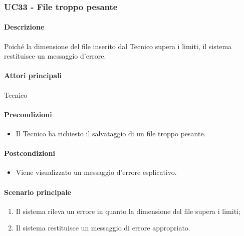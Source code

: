 \subsubsection{UC33 - File troppo pesante}\label{UC33}
\paragraph*{Descrizione}
Poiché la dimensione del file inserito dal Tecnico supera i limiti, il sistema restituisce un messaggio d'errore.

\paragraph*{Attori principali}
Tecnico

\paragraph*{Precondizioni}
\begin{itemize}
  \item Il Tecnico ha richiesto il salvataggio di un file troppo pesante.
\end{itemize}

\paragraph*{Postcondizioni}
\begin{itemize}
  \item Viene visualizzato un messaggio d'errore esplicativo.
\end{itemize}

\paragraph*{Scenario principale}
\begin{enumerate}
  \item Il sistema rileva un errore in quanto la dimensione del file supera i limiti;
  \item Il sistema restituisce un messaggio di errore appropriato.
\end{enumerate}
